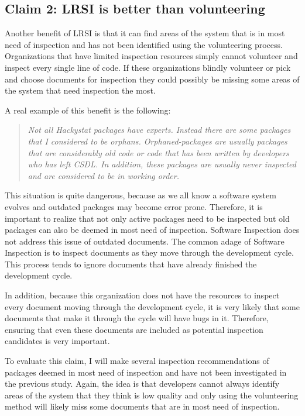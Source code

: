 \subsection{Claim 2: LRSI is better than volunteering}
\label{sec:claim2}
Another benefit of LRSI is that it can find areas of the system that is in
most need of inspection and has not been identified using the volunteering
process. Organizations that have limited inspection resources simply cannot
volunteer and inspect every single line of code. If these organizations
blindly volunteer or pick and choose documents for inspection they could
possibly be missing some areas of the system that need inspection the most.

A real example of this benefit is the following: 

\begin{quotation}
  \textit{ Not all Hackystat packages have experts. Instead there are some
    packages that I considered to be orphans. Orphaned-packages are usually
    packages that are considerably old code or code that has been written
    by developers who has left CSDL. In addition, these packages are
    usually never inspected and are considered to be in working order.  }
\end{quotation}

This situation is quite dangerous, because as we all know a software system
evolves and outdated packages may become error prone. Therefore, it is
important to realize that not only active packages need to be inspected but
old packages can also be deemed in most need of inspection. Software
Inspection \cite{Gilb93} does not address this issue of outdated
documents. The common adage of Software Inspection is to inspect documents
as they move through the development cycle. This process tends to ignore
documents that have already finished the development cycle.

In addition, because this organization does not have the resources to
inspect every document moving through the development cycle, it is very
likely that some documents that make it through the cycle will have bugs in
it. Therefore, ensuring that even these documents are included as potential
inspection candidates is very important.

\hspace*{1pt}

To evaluate this claim, I will make several inspection recommendations of
packages deemed in most need of inspection and have not been investigated
in the previous study. Again, the idea is that developers cannot always
identify areas of the system that they think is low quality and only using
the volunteering method will likely miss some documents that are in most
need of inspection.

